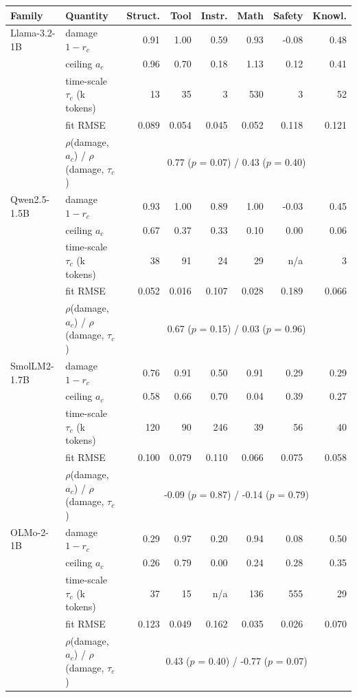 \begin{tabular}{llrrrrrr}
\toprule
Family & Quantity & Struct. & Tool & Instr. & Math & Safety & Knowl. \\
\midrule
Llama-3.2-1B & damage $1-r_c$ & 0.91 & 1.00 & 0.59 & 0.93 & -0.08 & 0.48 \\
 & ceiling $a_c$ & 0.96 & 0.70 & 0.18 & 1.13 & 0.12 & 0.41 \\
 & time-scale $\tau_c$ (k tokens) & 13 & 35 & 3 & 530 & 3 & 52 \\
 & fit RMSE & 0.089 & 0.054 & 0.045 & 0.052 & 0.118 & 0.121 \\
 & $\rho$(damage, $a_c$) / $\rho$(damage, $\tau_c$) & \multicolumn{6}{c}{0.77 ($p$ = 0.07) / 0.43 ($p$ = 0.40)} \\
\midrule
Qwen2.5-1.5B & damage $1-r_c$ & 0.93 & 1.00 & 0.89 & 1.00 & -0.03 & 0.45 \\
 & ceiling $a_c$ & 0.67 & 0.37 & 0.33 & 0.10 & 0.00 & 0.06 \\
 & time-scale $\tau_c$ (k tokens) & 38 & 91 & 24 & 29 & n/a & 3 \\
 & fit RMSE & 0.052 & 0.016 & 0.107 & 0.028 & 0.189 & 0.066 \\
 & $\rho$(damage, $a_c$) / $\rho$(damage, $\tau_c$) & \multicolumn{6}{c}{0.67 ($p$ = 0.15) / 0.03 ($p$ = 0.96)} \\
\midrule
SmolLM2-1.7B & damage $1-r_c$ & 0.76 & 0.91 & 0.50 & 0.91 & 0.29 & 0.29 \\
 & ceiling $a_c$ & 0.58 & 0.66 & 0.70 & 0.04 & 0.39 & 0.27 \\
 & time-scale $\tau_c$ (k tokens) & 120 & 90 & 246 & 39 & 56 & 40 \\
 & fit RMSE & 0.100 & 0.079 & 0.110 & 0.066 & 0.075 & 0.058 \\
 & $\rho$(damage, $a_c$) / $\rho$(damage, $\tau_c$) & \multicolumn{6}{c}{-0.09 ($p$ = 0.87) / -0.14 ($p$ = 0.79)} \\
\midrule
OLMo-2-1B & damage $1-r_c$ & 0.29 & 0.97 & 0.20 & 0.94 & 0.08 & 0.50 \\
 & ceiling $a_c$ & 0.26 & 0.79 & 0.00 & 0.24 & 0.28 & 0.35 \\
 & time-scale $\tau_c$ (k tokens) & 37 & 15 & n/a & 136 & 555 & 29 \\
 & fit RMSE & 0.123 & 0.049 & 0.162 & 0.035 & 0.026 & 0.070 \\
 & $\rho$(damage, $a_c$) / $\rho$(damage, $\tau_c$) & \multicolumn{6}{c}{0.43 ($p$ = 0.40) / -0.77 ($p$ = 0.07)} \\
\bottomrule
\end{tabular}
